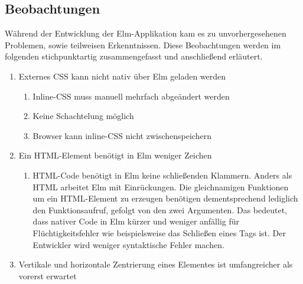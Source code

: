 
\subsection{Beobachtungen}
\label{sec:Beobachtungen}
Während der Entwicklung der Elm-Applikation kam es zu unvorhergesehenen Problemen, sowie teilweisen Erkenntnissen. Diese Beobachtungen werden im folgenden stichpunktartig zusammengefasst und anschließend erläutert.
\begin{enumerate}[label*=\arabic*.]

\item Externes \ac{CSS} kann nicht nativ über Elm geladen werden
	\begin{enumerate}[label*=\arabic*.]
		\item Inline-\ac{CSS} muss manuell mehrfach abgeändert werden
		\item Keine Schachtelung möglich
		\item Browser kann inline-\ac{CSS} nicht zwischenspeichern
	\end{enumerate}
\item Ein \ac{HTML}-Element benötigt in Elm weniger Zeichen
	\begin{enumerate}[label*=\arabic*.]
		\item \ac{HTML}-Code benötigt in Elm keine schließenden Klammern. Anders als \ac{HTML} arbeitet Elm mit Einrückungen. Die gleichnamigen Funktionen um ein \ac{HTML}-Element zu erzeugen benötigen dementsprechend lediglich den Funktionsaufruf, gefolgt von den zwei Argumenten. Das bedeutet, dass nativer Code in Elm kürzer und weniger anfällig für Flüchtigkeitsfehler wie beispielsweise das Schließen eines Tags ist. Der Entwickler wird weniger syntaktische Fehler machen.
	\end{enumerate}
\item Vertikale und horizontale Zentrierung eines Elementes ist umfangreicher als vorerst erwartet
	\begin{enumerate}[label*=\arabic*.]

\end{enumerate}
\end{enumerate}
